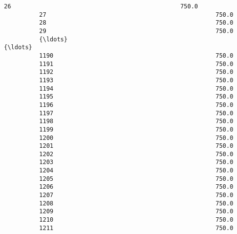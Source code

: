 \documentclass[11pt]{article}
\begin{document}
\begin{Verbatim}[commandchars=\\\{\}]
          26                                                750.0                               
          27                                                750.0                               
          28                                                750.0                               
          29                                                750.0                               
          {\ldots}                                                 {\ldots}                               
          1190                                              750.0                               
          1191                                              750.0                               
          1192                                              750.0                               
          1193                                              750.0                               
          1194                                              750.0                               
          1195                                              750.0                               
          1196                                              750.0                               
          1197                                              750.0                               
          1198                                              750.0                               
          1199                                              750.0                               
          1200                                              750.0                               
          1201                                              750.0                               
          1202                                              750.0                               
          1203                                              750.0                               
          1204                                              750.0                               
          1205                                              750.0                               
          1206                                              750.0                               
          1207                                              750.0                               
          1208                                              750.0                               
          1209                                              750.0                               
          1210                                              750.0                               
          1211                                              750.0                               

\end{Verbatim}
\end{document}
